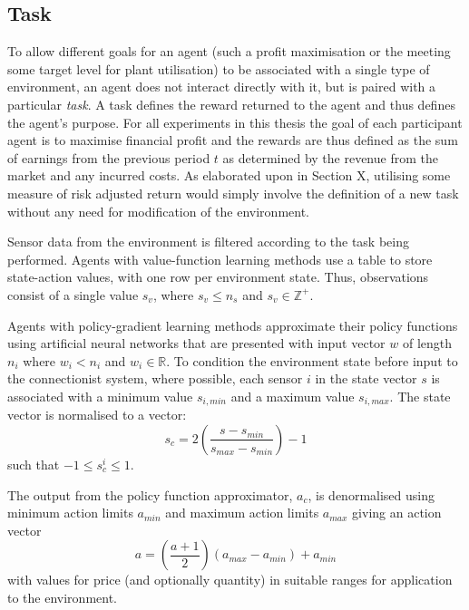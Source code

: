 \subsection{Task}
To allow different goals for an agent (such a profit maximisation or the
meeting some target level for plant utilisation) to be associated with a single
type of environment, an agent does not interact directly with it,
but is paired with a particular \textit{task}. A task defines the
reward returned to the agent and thus defines the agent's purpose.  For all
experiments in this thesis the goal of each participant agent is to maximise
financial profit and the rewards are thus defined as the sum of earnings from
the previous period $t$ as determined by the revenue from the market and any
incurred costs.  As elaborated upon in Section X, utilising some measure of
risk adjusted return would simply involve the definition of a new task without
any need for modification of the environment.

Sensor data from the environment is filtered according to the task
being performed.  Agents with value-function learning methods use a table to
store state-action values, with one row per environment state.  Thus, observations
consist of a single value $s_v$, where $s_v \leq n_s$ and $s_v \in
\mathbb{Z}^+$.

Agents with policy-gradient learning methods approximate their policy
functions using artificial neural networks that are presented with input vector
$w$ of length $n_i$ where $w_i < n_i$ and $w_i \in \mathbb{R}$.  To condition
the environment state before input to the connectionist system, where possible,
each sensor $i$ in the state vector $s$ is associated with a minimum value
$s_{i,min}$ and a maximum value $s_{i,max}$.   The state vector is normalised
to a vector:
\begin{equation}
s_c = 2\left(\frac{s - s_{min}}{s_{max} - s_{min}}\right) - 1
\end{equation}
such that $-1 \leq s_c^i \leq 1$.

The output from the policy function approximator, $a_c$, is denormalised using
minimum action limits $a_{min}$ and maximum action limits $a_{max}$ giving an action vector
\begin{equation}
a = \left(\frac{a + 1}{2}\right)(a_{max} - a_{min}) + a_{min}
\end{equation}
with values for price (and optionally quantity) in suitable ranges for
application to the environment.

